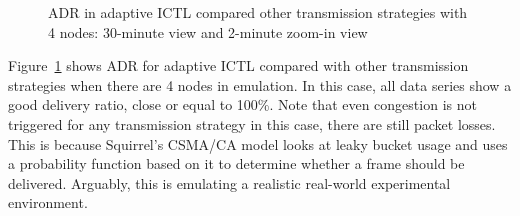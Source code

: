 \documentclass[12pt]{report}
\begin{document}
\begin{figure}[H]
  \caption{\label{fig:adaptive_adr_4}ADR in adaptive ICTL compared other transmission strategies with 4 nodes: 30-minute view and 2-minute zoom-in view}
\end{figure}

Figure~\ref{fig:adaptive_adr_4} shows ADR for adaptive ICTL compared with other transmission strategies when there are 4 nodes in emulation. In this case, all data series show a good delivery ratio, close or equal to 100\%. Note that even congestion is not triggered for any transmission strategy in this case, there are still packet losses. This is because Squirrel's CSMA/CA model looks at leaky bucket usage and uses a probability function based on it to determine whether a frame should be delivered. Arguably, this is emulating a realistic real-world experimental environment.
\end{document}
